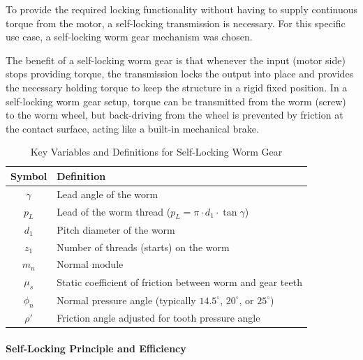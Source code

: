 To provide the required locking functionality without having to supply continuous torque from the motor, a self-locking transmission is necessary. For this specific use case, a self-locking worm gear mechanism was chosen.

The benefit of a self-locking worm gear is that whenever the input (motor side) stops providing torque, the transmission locks the output into place and provides the necessary holding torque to keep the structure in a rigid fixed position. In a self-locking worm gear setup, torque can be transmitted from the worm (screw) to the worm wheel, but back-driving from the wheel is prevented by friction at the contact surface, acting like a built-in mechanical brake.

\begin{table}[htbp]
    \centering
    \caption{Key Variables and Definitions for Self-Locking Worm Gear}
    \label{tab:worm-gear-variables}
    \begin{tabularx}{\textwidth}{|c|Z|}
        \hline
        \textbf{Symbol} & \textbf{Definition} \\
        \hline
        $\gamma$ & Lead angle of the worm \\
        \hline
        $p_L$ & Lead of the worm thread ($p_L = \pi \cdot d_1 \cdot \tan\gamma$) \\
        \hline
        $d_1$ & Pitch diameter of the worm \\
        \hline
        $z_1$ & Number of threads (starts) on the worm \\
        \hline
        $m_n$ & Normal module \\
        \hline
        $\mu_s$ & Static coefficient of friction between worm and gear teeth \\
        \hline
        $\phi_n$ & Normal pressure angle (typically $14.5^\circ$, $20^\circ$, or $25^\circ$) \\
        \hline
        $\rho'$ & Friction angle adjusted for tooth pressure angle \\
        \hline
    \end{tabularx}
\end{table}

\paragraph{Self-Locking Principle and Efficiency}

